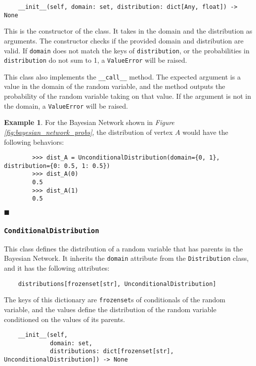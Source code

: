 \documentclass{article}
\theoremstyle{definition}
\newtheorem{example}{Example}
\newenvironment{exampleqed}
    {\begin{example}}
    {\hfill \qedsymbol \end{example}}
\renewcommand{\qedsymbol}{\(\blacksquare\)}
\begin{document}
\begin{verbatim}
    __init__(self, domain: set, distribution: dict[Any, float]) -> None
\end{verbatim}

This is the constructor of the class. It takes in the domain and the distribution as arguments. The constructor checks if the provided domain and distribution are valid. If \texttt{domain} does not match the keys of \texttt{distribution}, or the probabilities in \texttt{distribution} do not sum to 1, a \texttt{ValueError} will be raised.

This class also implements the \texttt{\_\_call\_\_} method. The expected argument is a value in the domain of the random variable, and the method outputs the probability of the random variable taking on that value. If the argument is not in the domain, a \texttt{ValueError} will be raised.

\begin{exampleqed}
    For the Bayesian Network shown in \textit{Figure \ref{fig:bayesian_network_probs}}, the distribution of vertex \(A\) would have the following behaviors:

    \begin{verbatim}
        >>> dist_A = UnconditionalDistribution(domain={0, 1}, distribution={0: 0.5, 1: 0.5})
        >>> dist_A(0)
        0.5
        >>> dist_A(1)
        0.5
    \end{verbatim}
\end{exampleqed}

\subsubsection{\texttt{ConditionalDistribution}}

This class defines the distribution of a random variable that has parents in the Bayesian Network. It inherits the \texttt{domain} attribute from the \texttt{Distribution} class, and it has the following attributes:

\begin{verbatim}
    distributions[frozenset[str], UnconditionalDistribution]
\end{verbatim}

The keys of this dictionary are \texttt{frozenset}s of conditionals of the random variable, and the values define the distribution of the random variable conditioned on the values of its parents.

\begin{verbatim}
    __init__(self,
             domain: set,
             distributions: dict[frozenset[str], UnconditionalDistribution]) -> None
\end{verbatim}
\end{document}
